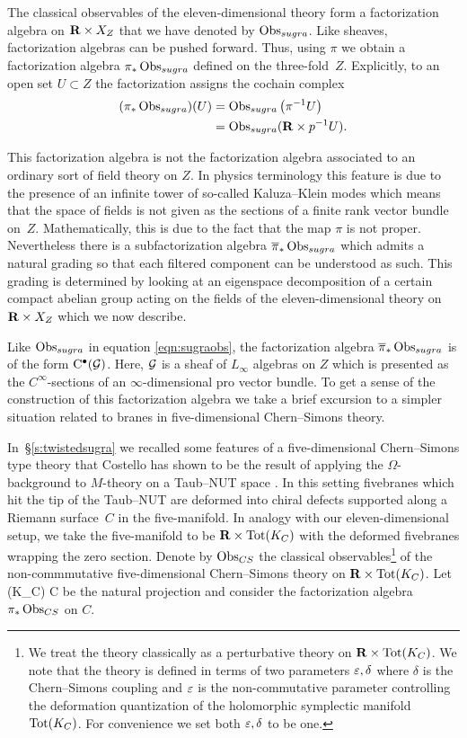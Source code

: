 The classical observables of the eleven-dimensional theory form a factorization algebra on $\mathbf{R} \times X_Z$ that we have denoted by $\operatorname{Obs}_{sugra}$.
Like sheaves, factorization algebras can be pushed forward.
Thus, using $\pi$ we obtain a factorization algebra $\pi_* \operatorname{Obs}_{sugra}$ defined on the three-fold~$Z$.
Explicitly, to an open set $U \subset Z$ the factorization assigns the cochain complex
\begin{align*}
(\pi_* \operatorname{Obs}_{sugra}) (U) & = \operatorname{Obs}_{sugra} \left(\pi^{-1} U\right) \\
& = \operatorname{Obs}_{sugra}(\mathbf{R} \times p^{-1}U) .
\end{align*}

This factorization algebra is not the factorization algebra associated to an ordinary sort of field theory on $Z$.
In physics terminology this feature is due to the presence of an infinite tower of so-called Kaluza--Klein modes which means that the space of fields is not given as the sections of a finite rank vector bundle on~$Z$.
Mathematically, this is due to the fact that the map $\pi$ is not proper.
Nevertheless there is a subfactorization algebra $\overline{\pi}_* \operatorname{Obs}_{sugra}$ which admits a natural grading so that each filtered component can be understood as such. 
This grading is determined by looking at an eigenspace decomposition of a certain compact abelian group acting on the fields of the eleven-dimensional theory on $\mathbf{R} \times X_Z$ which we now describe. 

Like $\operatorname{Obs}_{sugra}$ in equation \eqref{eqn:sugraobs}, the factorization algebra $\overline{\pi}_* \operatorname{Obs}_{sugra}$ is of the form ${\rm C}^\bullet(\mathcal G)$.
Here, $\mathcal G$ is a sheaf of $L_\infty$ algebras on $Z$ which is presented as the $C^\infty$-sections of an $\infty$-dimensional pro vector bundle.
To get a sense of the construction of this factorization algebra we take a brief excursion to a simpler situation related to branes in five-dimensional Chern--Simons theory. 

\parsec[]

In~\S \ref{s:twistedsugra} we recalled some features of a five-dimensional Chern--Simons type theory that Costello has shown to be the result of applying the $\Omega$-background to $M$-theory on a Taub--NUT space \cite{CostelloM5}.
In this setting fivebranes which hit the tip of the Taub--NUT are deformed into chiral defects supported along a Riemann surface~$C$ in the five-manifold. 
In analogy with our eleven-dimensional setup, we take the five-manifold to be $\mathbf{R} \times {\rm Tot}(K_C)$ with the deformed fivebranes wrapping the zero section.
Denote by $\operatorname{Obs}_{CS}$ the classical observables\footnote{We treat the theory classically as a perturbative theory on $\mathbf{R} \times {\rm Tot}(K_C)$.
We note that the theory is defined in terms of two parameters $\varepsilon, \delta$ where $\delta$ is the Chern--Simons coupling and $\varepsilon$ is the non-commutative parameter controlling the deformation quantization of the holomorphic symplectic manifold ${\rm Tot}(K_C)$.
For convenience we set both $\varepsilon, \delta$ to be one.}
of the non-commmutative five-dimensional Chern--Simons theory on $\mathbf{R} \times {\rm Tot}(K_C)$.
Let 
\beqn
\pi \colon \R {}(K_C) \to C
\eeqn
be the natural projection and consider the factorization algebra $\pi_* \operatorname{Obs}_{CS}$ on $C$. 


